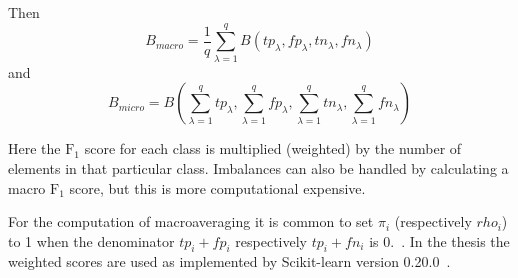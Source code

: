 Then~\citep{van2013macro}
\[
    B_{macro} = \frac{1}{q} \sum_{\lambda=1}^q B(tp_\lambda, fp_\lambda, tn_\lambda, fn_\lambda)
\]
and~\citep{van2013macro}
\[
    B_{micro} = B \left( \sum_{\lambda=1}^q tp_\lambda, \sum_{\lambda=1}^q fp_\lambda, \sum_{\lambda=1}^q tn_\lambda, \sum_{\lambda=1}^q fn_\lambda \right)
\]

Here the $\text{F}_1$ score for each class is multiplied (weighted) by the number of elements in that particular class.
Imbalances can also be handled by calculating a macro $\text{F}_1$ score, but this is more computational expensive.

For the computation of macroaveraging it is common to set $\pi_i$ (respectively $rho_i$) to 1 when the denominator $tp_i + fp_i$ respectively $tp_i + fn_i$ is 0.~\citep{debole2004supervised}.
\fi
In the thesis the weighted \fone scores are used as implemented by Scikit-learn version 0.20.0~\citep{scikit2018classification}.
